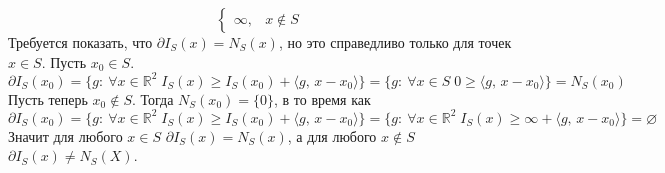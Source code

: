 \documentclass{article}
\newcommand*{\R}{\mathbb{R}}
\begin{document}
\begin{enumerate}[(a)]
\[\begin{cases}
            \infty, & x \not \in S
        \end{cases} \]
        Требуется показать, что $\partial I_S(x) = N_S(x)$, но это справедливо только для точек $x \in S$. Пусть $x_0 \in S$.
        \[ \partial I_S(x_0) = \{ g :\: \forall x \in \R^2 \; I_S(x) \geqslant I_S(x_0) + \langle g,\, x - x_0 \rangle \} = \{ g :\: \forall x \in S \; 0 \geqslant \langle g,\, x - x_0 \rangle \} = N_S(x_0) \]
        Пусть теперь $x_0 \not \in S$. Тогда $N_S(x_0) = \{ 0 \}$, в то время как
        \[ \partial I_S(x_0) = \{ g :\: \forall x \in \R^2 \; I_S(x) \geqslant I_S(x_0) + \langle g,\, x - x_0 \rangle \} = \{ g :\: \forall x \in \R^2 \; I_S(x) \geqslant \infty + \langle g,\, x - x_0 \rangle \} = \varnothing \]
        Значит для любого $x \in S$ $\partial I_S(x) = N_S(x)$, а для любого $x \not \in S$ $\partial I_S(x) \neq N_S(X)$.
\end{enumerate}
\end{document}
